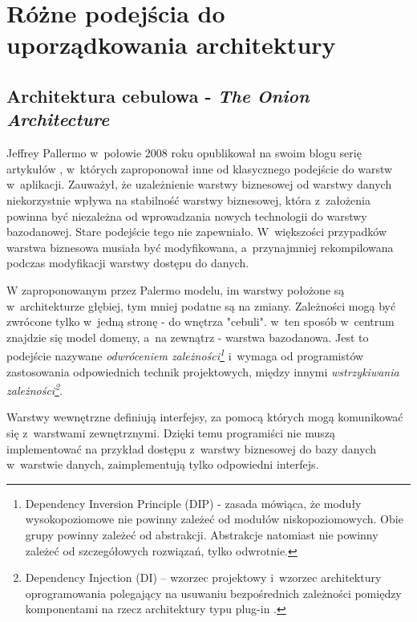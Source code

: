 \section{Różne podejścia do uporządkowania architektury}
\subsection{Architektura cebulowa - \textit{The Onion Architecture}}
Jeffrey Pallermo w~połowie 2008 roku opublikował na swoim blogu serię artykułów  \cite{website:architect:onion}, w~których zaproponował inne od klasycznego podejście do warstw w~aplikacji. Zauważył, że uzależnienie warstwy biznesowej od warstwy danych niekorzystnie wpływa na stabilność warstwy biznesowej, która z~założenia powinna być niezależna od wprowadzania nowych technologii do warstwy bazodanowej. Stare podejście tego nie zapewniało. W~większości przypadków warstwa biznesowa musiała być modyfikowana, a~przynajmniej rekompilowana podczas modyfikacji warstwy dostępu do danych.

W zaproponowanym przez Palermo modelu, im warstwy położone są w~architekturze głębiej, tym mniej podatne są na zmiany. Zależności mogą być zwrócone tylko w~jedną stronę - do wnętrza "cebuli". w~ten sposób w~centrum znajdzie się model domeny, a~na zewnątrz - warstwa bazodanowa. Jest to podejście nazywane \textit{odwróceniem zależności\footnote{Dependency Inversion Principle (DIP) - zasada mówiąca, że moduły wysokopoziomowe nie powinny zależeć od modułów niskopoziomowych. Obie grupy powinny zależeć od abstrakcji. Abstrakcje natomiast nie powinny zależeć od szczegółowych rozwiązań, tylko odwrotnie.}} i~wymaga od programistów zastosowania odpowiednich technik projektowych, między innymi \textit{wstrzykiwania zależności\footnote{Dependency Injection (DI) – wzorzec projektowy i~wzorzec architektury oprogramowania polegający na usuwaniu bezpośrednich zależności pomiędzy komponentami na rzecz architektury typu plug-in \cite{website:wikipedia}.}}.

Warstwy wewnętrzne definiują interfejsy, za pomocą których mogą komunikować się z~warstwami zewnętrznymi. Dzięki temu programiści nie muszą implementować na przykład dostępu z~warstwy biznesowej do bazy danych w~warstwie danych, zaimplementują tylko odpowiedni interfejs.

